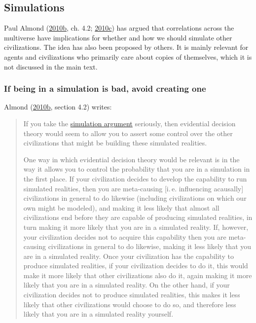 \hypertarget{simulations}{\subsection{Simulations}\label{simulations}}

Paul Almond
(\href{https://web.archive.org/web/20120310010225/http://www.paul-almond.com/Correlation2.pdf}{2010b},
ch. 4.2;
\href{https://www.researchgate.net/publication/265224117_Can_you_retroactively_put_yourself_in_a_computer_simulation}{2010c})
has argued that correlations across the multiverse have implications for
whether and how we should simulate other civilizations. The idea has
also been proposed by others. It is mainly relevant for agents and
civilizations who primarily care about copies of themselves, which it is
not discussed in the main text.

\subsubsection{If being in a simulation is bad, avoid creating
one}\label{if-being-in-a-simulation-is-bad-avoid-creating-one}

Almond
(\href{https://web.archive.org/web/20120310010225/http://www.paul-almond.com/Correlation2.pdf}{2010b},
section 4.2) writes:

\begin{quote}
If you take the
\href{http://www.simulation-argument.com/}{simulation argument}
seriously, then evidential decision theory would seem to allow you to
assert some control over the other civilizations that might be building
these simulated realities.

One way in which evidential decision theory would be relevant is in the
way it allows you to control the probability that you are in a
simulation in the first place. If your civilization decides to develop
the capability to run simulated realities, then you are meta-causing
{[}i.\,e. influencing acausally{]} civilizations in general to do likewise
(including civilizations on which our own might be modeled), and making
it less likely that almost all civilizations end before they are capable
of producing simulated realities, in turn making it more likely that you
are in a simulated reality. If, however, your civilization decides not
to acquire this capability then you are meta-causing civilizations in
general to do likewise, making it less likely that you are in a
simulated reality. Once your civilization has the capability to produce
simulated realities, if your civilization decides to do it, this would
make it more likely that other civilizations also do it, again making it
more likely that you are in a simulated reality. On the other hand, if
your civilization decides not to produce simulated realities, this makes
it less likely that other civilizations would choose to do so, and
therefore less likely that you are in a simulated reality yourself.
\end{quote}

